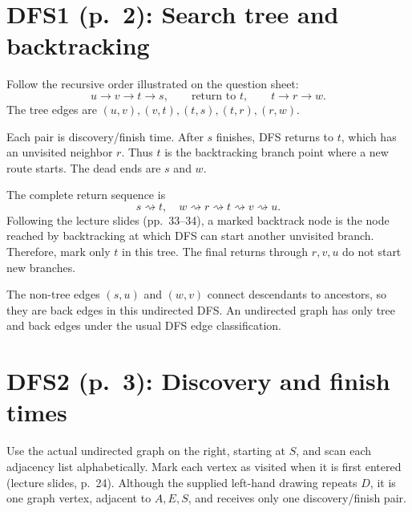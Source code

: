 \documentclass[11pt,a4paper]{article}
\newcommand{\question}[2]{\section*{#1: #2}}
\begin{document}
\newpage
\question{DFS1 (p.\ 2)}{Search tree and backtracking}
Follow the recursive order illustrated on the question sheet:
\[
u\to v\to t\to s,\qquad\text{return to }t,\qquad t\to r\to w.
\]
The tree edges are $(u,v),(v,t),(t,s),(t,r),(r,w)$.
\begin{center}\end{center}
Each pair is discovery/finish time. After $s$ finishes, DFS returns to $t$, which has an unvisited neighbor $r$. Thus $\boxed{t}$ is the backtracking branch point where a new route starts. The dead ends are $s$ and $w$.

The complete return sequence is
\[
s\rightsquigarrow t,\quad w\rightsquigarrow r\rightsquigarrow t\rightsquigarrow v\rightsquigarrow u.
\]
Following the lecture slides (pp.\ 33--34), a marked backtrack node is the node reached by backtracking at which DFS can start another unvisited branch. Therefore, mark only $\boxed{t}$ in this tree. The final returns through $r,v,u$ do not start new branches.

The non-tree edges $(s,u)$ and $(w,v)$ connect descendants to ancestors, so they are back edges in this undirected DFS. An undirected graph has only tree and back edges under the usual DFS edge classification.

\newpage
\question{DFS2 (p.\ 3)}{Discovery and finish times}
Use the actual undirected graph on the right, starting at $S$, and scan each adjacency list alphabetically. Mark each vertex as visited when it is first entered (lecture slides, p.\ 24). Although the supplied left-hand drawing repeats $D$, it is one graph vertex, adjacent to $A,E,S$, and receives only one discovery/finish pair.
\end{document}
